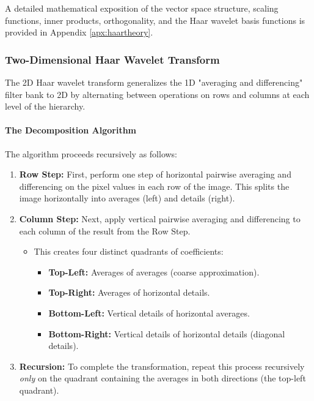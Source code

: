 A detailed mathematical exposition of the vector space structure, scaling functions, inner products, orthogonality, and the Haar wavelet basis functions is provided in Appendix \ref{apx:haartheory}.




\subsubsection{Two-Dimensional Haar Wavelet Transform}

The 2D Haar wavelet transform generalizes the 1D "averaging and differencing" filter bank to 2D by alternating between operations on rows and columns at each level of the hierarchy.

\paragraph{The Decomposition Algorithm}

The algorithm proceeds recursively as follows:

\begin{enumerate}
\item \textbf{Row Step:} First, perform one step of horizontal pairwise averaging and differencing on the pixel values in each row of the image. This splits the image horizontally into averages (left) and details (right).

\item \textbf{Column Step:} Next, apply vertical pairwise averaging and differencing to each column of the result from the Row Step.
\begin{itemize}
\item This creates four distinct quadrants of coefficients:
\begin{itemize}
\item \textbf{Top-Left:} Averages of averages (coarse approximation).
\item \textbf{Top-Right:} Averages of horizontal details.
\item \textbf{Bottom-Left:} Vertical details of horizontal averages.
\item \textbf{Bottom-Right:} Vertical details of horizontal details (diagonal details).
\end{itemize}
\end{itemize}

\item \textbf{Recursion:} To complete the transformation, repeat this process recursively \textit{only} on the quadrant containing the averages in both directions (the top-left quadrant).
\end{enumerate}

